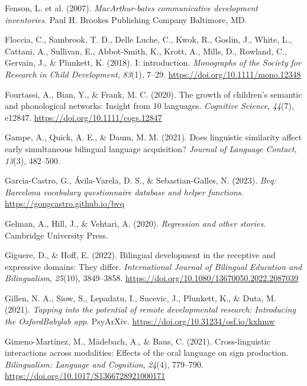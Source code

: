 \documentclass[
]{article}
\newlength{\cslhangindent}
\newlength{\cslentryspacingunit} %
\newenvironment{CSLReferences}[2] %
 {%
  \setlength{\parindent}{0pt}
  \ifodd #1
  \let\oldpar\par
  \def\par{\hangindent=\cslhangindent\oldpar}
  \fi
  \setlength{\parskip}{#2\cslentryspacingunit}
 }%
 {}
\begin{document}
\begin{CSLReferences}{1}{0}
\leavevmode{}%
Fenson, L. et al. (2007). \emph{{MacArthur}-bates communicative
development inventories}. Paul H. Brookes Publishing Company Baltimore,
{MD}.

\leavevmode{}%
Floccia, C., Sambrook, T. D., Delle Luche, C., Kwok, R., Goslin, J.,
White, L., Cattani, A., Sullivan, E., Abbot‐Smith, K., Krott, A., Mills,
D., Rowland, C., Gervain, J., \& Plunkett, K. (2018). I: introduction.
\emph{Monographs of the Society for Research in Child Development},
\emph{83}(1), 7--29. \url{https://doi.org/10.1111/mono.12348}

\leavevmode{}%
Fourtassi, A., Bian, Y., \& Frank, M. C. (2020). The growth of
children's semantic and phonological networks: Insight from 10
languages. \emph{Cognitive Science}, \emph{44}(7), e12847.
\url{https://doi.org/10.1111/cogs.12847}

\leavevmode{}%
Gampe, A., Quick, A. E., \& Daum, M. M. (2021). Does linguistic
similarity affect early simultaneous bilingual language acquisition?
\emph{Journal of Language Contact}, \emph{13}(3), 482--500.

\leavevmode{}%
Garcia-Castro, G., Ávila-Varela, D. S., \& Sebastian-Galles, N. (2023).
\emph{Bvq: Barcelona vocabulary questionnaire database and helper
functions}. \url{https://gongcastro.github.io/bvq}

\leavevmode{}%
Gelman, A., Hill, J., \& Vehtari, A. (2020). \emph{Regression and other
stories}. Cambridge University Press.

\leavevmode{}%
Giguere, D., \& Hoff, E. (2022). Bilingual development in the receptive
and expressive domains: They differ. \emph{International Journal of
Bilingual Education and Bilingualism}, \emph{25}(10), 3849--3858.
\url{https://doi.org/10.1080/13670050.2022.2087039}

\leavevmode{}%
Gillen, N. A., Siow, S., Lepadatu, I., Sucevic, J., Plunkett, K., \&
Duta, M. (2021). \emph{Tapping into the potential of remote
developmental research: Introducing the {OxfordBabylab} app}.
{PsyArXiv}. \url{https://doi.org/10.31234/osf.io/kxhmw}

\leavevmode{}%
Gimeno-Martínez, M., Mädebach, A., \& Baus, C. (2021). Cross-linguistic
interactions across modalities: Effects of the oral language on sign
production. \emph{Bilingualism: Language and Cognition}, \emph{24}(4),
779--790. \url{https://doi.org/10.1017/S1366728921000171}


\end{CSLReferences}
\end{document}
